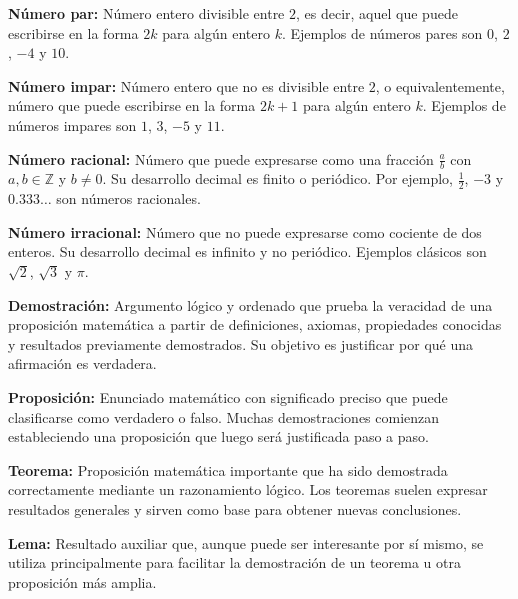 \documentclass[12pt,final]{report}
\theoremstyle{plain}
\theoremstyle{definition}
\begin{document}
\vspace{0.5em}

\textbf{Número par:} Número entero divisible entre $2$, es decir, aquel que puede escribirse en la forma $2k$ para algún entero $k$. Ejemplos de números pares son $0$, $2$, $-4$ y $10$.

\vspace{0.5em}

\textbf{Número impar:} Número entero que no es divisible entre $2$, o equivalentemente, número que puede escribirse en la forma $2k+1$ para algún entero $k$. Ejemplos de números impares son $1$, $3$, $-5$ y $11$.

\vspace{0.5em}

\textbf{Número racional:} Número que puede expresarse como una fracción $\frac{a}{b}$ con $a, b \in \mathbb{Z}$ y $b \neq 0$. Su desarrollo decimal es finito o periódico. Por ejemplo, $\frac{1}{2}$, $-3$ y $0.333\ldots$ son números racionales.

\vspace{0.5em}

\textbf{Número irracional:} Número que no puede expresarse como cociente de dos enteros. Su desarrollo decimal es infinito y no periódico. Ejemplos clásicos son $\sqrt{2}$, $\sqrt{3}$ y $\pi$.

\vspace{0.5em}

\textbf{Demostración:} Argumento lógico y ordenado que prueba la veracidad de una proposición matemática a partir de definiciones, axiomas, propiedades conocidas y resultados previamente demostrados. Su objetivo es justificar por qué una afirmación es verdadera.

\vspace{0.5em}

\textbf{Proposición:} Enunciado matemático con significado preciso que puede clasificarse como verdadero o falso. Muchas demostraciones comienzan estableciendo una proposición que luego será justificada paso a paso.

\vspace{0.5em}

\textbf{Teorema:} Proposición matemática importante que ha sido demostrada correctamente mediante un razonamiento lógico. Los teoremas suelen expresar resultados generales y sirven como base para obtener nuevas conclusiones.

\vspace{0.5em}

\textbf{Lema:} Resultado auxiliar que, aunque puede ser interesante por sí mismo, se utiliza principalmente para facilitar la demostración de un teorema u otra proposición más amplia.
\end{document}
